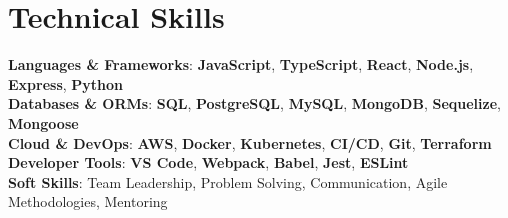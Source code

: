 \documentclass[letterpaper,11pt]{article}
\begin{document}
\section{Technical Skills}
\begin{itemize}[leftmargin=0.15in, label={}]
    \small{\item{
     \textbf{Languages \& Frameworks}{: \textbf{JavaScript}, \textbf{TypeScript}, \textbf{React}, \textbf{Node.js}, \textbf{Express}, \textbf{Python}} \\
     \textbf{Databases \& ORMs}{: \textbf{SQL}, \textbf{PostgreSQL}, \textbf{MySQL}, \textbf{MongoDB}, \textbf{Sequelize}, \textbf{Mongoose}} \\
     \textbf{Cloud \& DevOps}{: \textbf{AWS}, \textbf{Docker}, \textbf{Kubernetes}, \textbf{CI/CD}, \textbf{Git}, \textbf{Terraform}} \\
     \textbf{Developer Tools}{: \textbf{VS Code}, \textbf{Webpack}, \textbf{Babel}, \textbf{Jest}, \textbf{ESLint}} \\
     \textbf{Soft Skills}{: Team Leadership, Problem Solving, Communication, Agile Methodologies, Mentoring} \\
    }}
\end{itemize}
\end{document}
